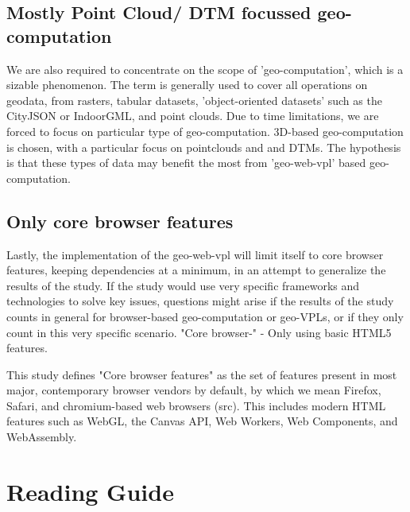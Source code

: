\subsection*{Mostly Point Cloud/ DTM focussed geo-computation}
We are also required to concentrate on the scope of 'geo-computation', which is a sizable phenomenon.
The term is generally used to cover all operations on geodata, from rasters, tabular datasets, 'object-oriented datasets' such as the CityJSON or IndoorGML, and point clouds. 
Due to time limitations, we are forced to focus on particular type of geo-computation.
3D-based geo-computation is chosen, with a particular focus on pointclouds and and DTMs. 
The hypothesis is that these types of data may benefit the most from 'geo-web-vpl' based geo-computation.

\subsection*{Only core browser features}
Lastly, the implementation of the geo-web-vpl will limit itself to core browser features, keeping dependencies at a minimum, in an attempt to generalize the results of the study.
If the study would use very specific frameworks and technologies to solve key issues, questions might arise if the results of the study counts in general for browser-based geo-computation or geo-VPLs, or if they only count in this very specific scenario. 
"Core browser-"
- Only using basic HTML5 features.

This study defines "Core browser features" as the set of features present in most major, contemporary browser vendors by default, by which we mean Firefox, Safari, and chromium-based web browsers (src). 
This includes modern HTML features such as WebGL, the Canvas API, Web Workers, Web Components, and WebAssembly. 

\newpage
\section{Reading Guide}

